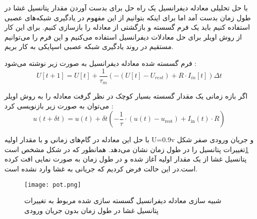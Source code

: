 با حل تحلیلی معادله دیفرانسیل یک راه حل برای بدست آوردن مقدار پتانسیل غشا در طول زمان بدست آمد اما برای اینکه بتوانیم از این مفهوم در یادگیری شبکه‌های عصبی استفاده کنیم باید یک فرم گسسته و بازگشتی از معادله را بازسازی کنیم. برای این کار از روش اویلر برای حل معادلات دیفرانسیل استفاده می‌کنیم و این فرم را می‌توانیم مستقیم در روند یادگیری شبکه عصبی اسپایکی به کار بریم.
 
فرم گسسته شده معادله دیفرانسیل به صورت زیر نوشته می‌شود :
 \begin{equation}
U[t+1] = U[t] + \frac{1}{\tau_m} \left( - (U[t] - U_{rest}) + R \cdot I_{in}[t] \right) \Delta t
 \end{equation}

  
  اگر بازه زمانی یک مقدار گسسته بسیار کوچک در نظر گرفت معادله را به روش اویلر می‌توان به صورت زیر بازنویسی کرد :
  \begin{equation}
  	u(t + \delta t) = u(t) + \delta t \left( -\frac{1}{\tau} \cdot (u(t) - u_{\text{rest}}) + I_{\text{in}}(t) \cdot R \right)
  \end{equation}
  
  با حل این معادله در گام‌های زمانی و با مقدار اولیه U=0.9v  و جریان ورودی صفر شکل  \ref{fig:neuron8}تغییرات پتانسیل را در طول زمان نشان می‌دهد. همانطور که در شکل مشخص است پتانسیل غشا از یک مقدار اولیه آغاز شده و در طول زمان به صورت نمایی افت کرده است.در این حالت فرض کردیم که جریانی به غشا وارد نشده است.
  \begin{figure}[h]
  	\centering
  	\texttt{[image: pot.png]}
  	\captionsetup{font=small} %
  	\caption{شبیه سازی معادله دیفرانسیل گسسته سازی شده مربوط به تغییرات پتانسیل غشا در طول زمان بدون جریان ورودی}
  	\label{fig:neuron8}
  \end{figure}
  
